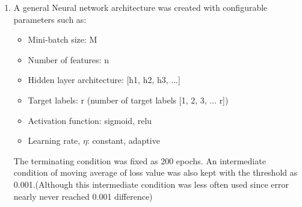 \begin{enumerate}[label=(\alph*)]
    \item A general Neural network architecture was created with configurable parameters such as:
    \begin{itemize}
        \item Mini-batch size: M
        \item Number of features: n
        \item Hidden layer architecture: [h1, h2, h3, ...]
        \item Target labels: r (number of target labels [1, 2, 3, ... r])
        \item Activation function: sigmoid, relu
        \item Learning rate, $\eta$: constant, adaptive
    \end{itemize}
    The terminating condition was fixed as 200 epochs. An intermediate condition of moving average of loss value was also kept with the
    threshold as 0.001.(Although this intermediate condition was less often used since error nearly never reached 0.001 difference)


\end{enumerate}
